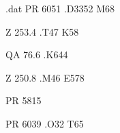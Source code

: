 \begin{filecontents*}{\jobname.dat}
PR
6051
.D3352
M68

Z
253.4
.T47
K58

QA
76.6
.K644

Z
250.8
.M46
E578

PR
5815

PR
6039
.O32
T65
\end{filecontents*}
\documentclass[letterpaper,10pt]{article}

\usepackage{textmerg}

\usepackage[newdimens]{labels}
\LeftPageMargin=4mm
\RightPageMargin=4mm
\TopPageMargin=12.5mm
\BottomPageMargin=13mm
\InterLabelColumn=4mm
\InterLabelRow=0mm
\LeftLabelBorder=0.2mm
\RightLabelBorder=0.2mm
\TopLabelBorder=0.2mm
\BottomLabelBorder=0mm

\LabelGridtrue %
\LabelInfotrue %


\Fields{\subclass\number\cutter}

%

